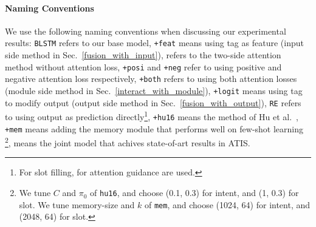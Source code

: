 \paragraph{Naming Conventions}
We use the following naming conventions when discussing our experimental results:
%
\texttt{BLSTM} refers to our base model,
\texttt{+feat} means using \RE tag as feature (input side method in Sec.~\ref{fusion_with_input}),
\ptatt refers to the two-side attention method without attention loss,
\texttt{+posi} and \texttt{+neg} refer to using positive and negative attention loss respectively, \texttt{+both} refers to using both attention losses (\NN module side method in Sec.~\ref{interact_with_module}),
\texttt{+logit} means using \RE tag to modify \NN output (output side method in Sec.~\ref{fusion_with_output}),
\texttt{RE} refers to using \RE output as prediction directly\footnote{
For slot filling, \REs for attention guidance are used.},
\texttt{+hu16} means the method of Hu et al.~,
\texttt{+mem} means adding the memory module that performs well on few-shot learning \cite{kaiser2017learning}\footnote{
We tune $C$ and $\pi_0$ of \texttt{hu16}, and choose (0.1, 0.3) for intent, and (1, 0.3) for slot. We tune memory-size and $k$ of \texttt{mem}, and choose (1024, 64) for intent, and (2048, 64) for slot.
},
\LL means the joint model \cite{liu2016attention} that achives state-of-art results in ATIS.
